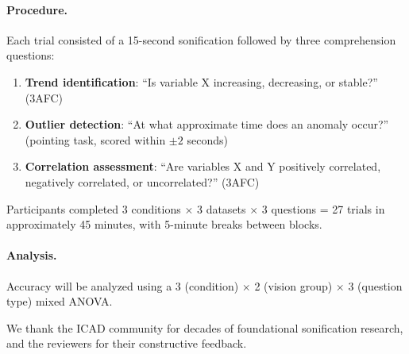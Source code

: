 \documentclass[sigchi, nonacm]{acmart}
\begin{document}
\paragraph{Procedure.} Each trial consisted of a 15-second sonification followed by three comprehension questions:
\begin{enumerate}
    \item \textbf{Trend identification}: ``Is variable X increasing, decreasing, or stable?'' (3AFC)
    \item \textbf{Outlier detection}: ``At what approximate time does an anomaly occur?'' (pointing task, scored within $\pm 2$ seconds)
    \item \textbf{Correlation assessment}: ``Are variables X and Y positively correlated, negatively correlated, or uncorrelated?'' (3AFC)
\end{enumerate}

Participants completed 3 conditions $\times$ 3 datasets $\times$ 3 questions = 27 trials in approximately 45 minutes, with 5-minute breaks between blocks.

\paragraph{Analysis.} Accuracy will be analyzed using a 3 (condition) $\times$ 2 (vision group) $\times$ 3 (question type) mixed ANOVA.

\begin{acks}
We thank the ICAD community for decades of foundational sonification research, and the reviewers for their constructive feedback.
\end{acks}


\end{document}
